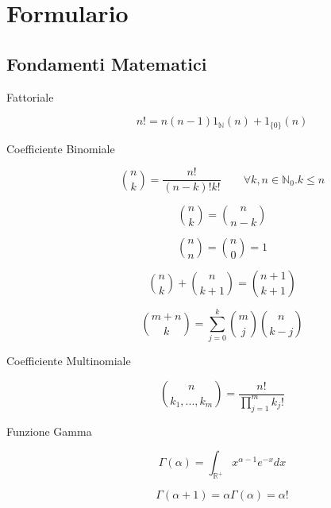\clearpage
\section{Formulario}
\label{sec:formulary}

\subsection{Fondamenti Matematici}

\begin{description}
	
	\item[Fattoriale]
	\begin{equation}
	n! = n(n-1)\mathfrak{1}_{\mathbb{N}}(n) + \mathfrak{1}_{\{0\}}(n)
	\end{equation}
	
	\item[Coefficiente Binomiale]
	\begin{equation}
	\binom{n}{k} = \frac{n!}{(n-k)!k!} \qquad\forall k,n\in\mathbb{N}_{0}.k\leq n
	\end{equation}
	
	\begin{equation}
	\binom{n}{k} = \binom{n}{n-k}
	\end{equation}
	
	\begin{equation}
	\binom{n}{n} = \binom{n}{0} = 1
	\end{equation}
	
	\begin{equation}
	\binom{n}{k}+\binom{n}{k+1} = \binom{n+1}{k+1}
	\end{equation}
	
	\begin{equation}
	\binom{m+n}{k} = \sum_{j=0}^{k}\binom{m}{j}\binom{n}{k-j}
	\end{equation}
	
	\item[Coefficiente Multinomiale]
	\begin{equation}
	\binom{n}{k_{1},...,k_{m}} = \frac{n!}{\prod_{j=1}^{m}k_{j}!}
	\end{equation}
	
	\item[Funzione Gamma]
	\begin{equation}
	\Gamma(\alpha) = \int_{\mathbb{R}^{+}} x^{\alpha-1}e^{-x}dx
	\end{equation}
	
	\begin{equation}
	\Gamma(\alpha+1) = 	\alpha\Gamma(\alpha) = \alpha!
	\end{equation}
	

\end{description}
